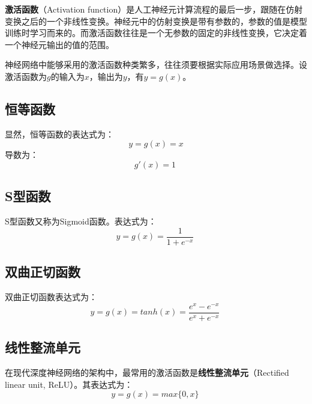 
\textbf{激活函数}（Activation function）是人工神经元计算流程的最后一步，跟随在仿射变换之后的一个非线性变换。神经元中的仿射变换是带有参数的，参数的值是模型训练时学习而来的。而激活函数往往是一个无参数的固定的非线性变换，它决定着一个神经元输出的值的范围。

神经网络中能够采用的激活函数种类繁多，往往须要根据实际应用场景做选择。设激活函数为$g$的输入为$x$，输出为$y$，有$y=g(x)$。


\subsection{恒等函数}
显然，恒等函数的表达式为：
\begin{equation}
y=g(x)=x
\end{equation}
导数为：
\begin{equation}
g'(x)=1~
\end{equation}

\subsection{S型函数}
S型函数又称为Sigmoid函数。表达式为：
\begin{equation}
y=g(x)=\frac{1}{1+e^{-x}}~
\end{equation}

\subsection{双曲正切函数}
双曲正切函数表达式为：
\begin{equation}
y=g(x)=tanh(x)=\frac{e^x-e^{-x}}{e^x+e^{-x}}~
\end{equation}

\subsection{线性整流单元}
在现代深度神经网络的架构中，最常用的激活函数是\textbf{线性整流单元}（Rectified linear unit, ReLU）。其表达式为：
\begin{equation}
y=g(x)=max\{0,x\}~
\end{equation}

